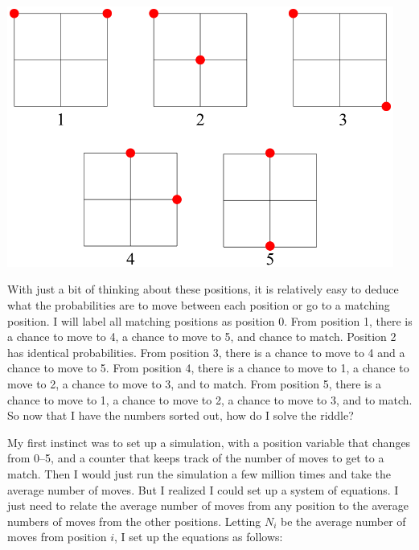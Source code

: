 \documentclass{article}
\begin{document}
\vspace{0.2in}
\begin{center}
\includegraphics[width=5in]{all_scenarios.png}
\end{center}
\vspace{0.2in}

With just a bit of thinking about these positions, it is relatively easy to deduce what the probabilities are to move between each position or go to a matching position.
I will label all matching positions as position 0.
From position 1, there is a  chance to move to 4, a  chance to move to 5, and  chance to match.
Position 2 has identical probabilities.
From position 3, there is a  chance to move to 4 and a  chance to move to 5.
From position 4, there is a  chance to move to 1, a  chance to move to 2, a  chance to move to 3, and  to match.
From position 5, there is a  chance to move to 1, a  chance to move to 2, a  chance to move to 3, and  to match.
So now that I have the numbers sorted out, how do I solve the riddle?

My first instinct was to set up a simulation, with a position variable that changes from 0--5, and a counter that keeps track of the number of moves to get to a match.
Then I would just run the simulation a few million times and take the average number of moves.
But I realized I could set up a system of equations.
I just need to relate the average number of moves from any position to the average numbers of moves from the other positions.
Letting $N_{i}$ be the average number of moves from position $i$, I set up the equations as follows:
\end{document}
